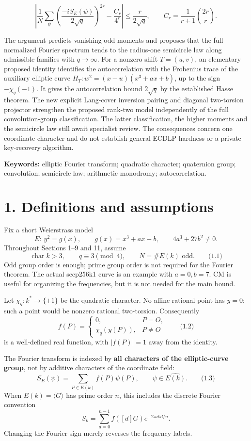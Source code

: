 \documentclass[
  11pt,
  a4paper,
]{article}
\begin{document}
\[
\left|\frac1N\sum_\psi\left(\frac{-iS_E(\psi)}{2\sqrt q}\right)^{2r}
-\frac{C_r}{4^r}\right|\leq\frac{r}{2\sqrt q},\qquad
C_r=\frac1{r+1}\binom{2r}{r}.
\]

The argument predicts vanishing odd moments and proposes that the full
normalized Fourier spectrum tends to the radius-one semicircle law along
admissible families with \(q\to\infty\). For a nonzero shift \(T=(u,v)\), an elementary proposed identity identifies
the autocorrelation with the Frobenius trace of the auxiliary elliptic
curve \(H_T:w^2=(x-u)(x^3+ax+b)\), up to the sign
\(-\chi_q(-1)\). It gives the autocorrelation bound \(2\sqrt q\)
by the established Hasse theorem. The new explicit Lang-cover inversion pairing and diagonal
two-torsion projector strengthen the proposed rank-two model independently
of the full convolution-group classification. The latter classification,
the higher moments and the semicircle law still await specialist review. The consequences concern one
coordinate character and do not establish general ECDLP hardness or a
private-key-recovery algorithm.

\textbf{Keywords:} elliptic Fourier transform; quadratic character;
quaternion group; convolution; semicircle law; arithmetic monodromy;
autocorrelation.

\section{1. Definitions and
assumptions}\label{definitions-and-assumptions}

Fix a short Weierstrass model \[
E:\ y^2=g(x),\qquad g(x)=x^3+a x+b,
\qquad 4a^3+27b^2\ne0.
\] Throughout Sections 1--9 and 11, assume \[
\operatorname{char}k>3,\qquad q\equiv3\pmod4,\qquad N=\#E(k)\text{ odd}.
\qquad \text{(1.1)}
\] Odd group order is enough; prime group order is not required for the
Fourier theorem. The actual secp256k1 curve is an example with
\(a=0,b=7\). CM is useful for organizing the frequencies, but it is not
needed for the main bound.

Let \(\chi_q:k^*\to\{\pm1\}\) be the quadratic character. No affine
rational point has \(y=0\): such a point would be nonzero rational
two-torsion. Consequently \[
f(P)=\begin{cases}0,&P=O,\\ \chi_q(y(P)),&P\ne O\end{cases}
\qquad \text{(1.2)}
\] is a well-defined real function, with \(|f(P)|=1\) away from the
identity.

The Fourier transform is indexed by \textbf{all characters of the
elliptic-curve group}, not by additive characters of the coordinate
field: \[
S_E(\psi)=\sum_{P\in E(k)}f(P)\psi(P),
\qquad \psi\in\widehat{E(k)}.
\qquad \text{(1.3)}
\] When \(E(k)=\langle G\rangle\) has prime order \(n\), this includes
the discrete Fourier convention \[
S_k=\sum_{d=0}^{n-1}f([d]G)e^{-2\pi i k d/n}.
\] Changing the Fourier sign merely reverses the frequency labels.
\end{document}
